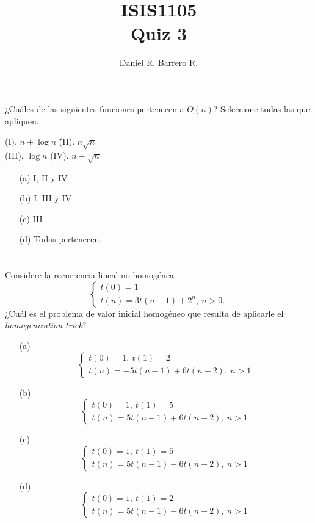 \documentclass{amsart}
\title{ISIS1105 \\ Quiz 3}
\author{Daniel R. Barrero R.}
\begin{document}
\maketitle

\section{} ¿Cuáles de las siguientes funciones pertenecen a $O(n)$? Seleccione
todas las que apliquen.
\begin{tabbing}
	(I). $n + \log n$ \= (II). $n\sqrt{n}$\\
	(III). $\log n$   \> (IV). $n + \sqrt{n}$
\end{tabbing}
\begin{enumerate}
	\item[(a)] I, II y IV
	\item[(b)] I, III y IV
	\item[(c)] III
	\item[(d)] Todas pertenecen.
\end{enumerate}

%

\section{} Considere la recurrencia lineal no-homogénea
\[
	\begin{cases}
		t(0)= 1\\
		t(n)= 3t(n-1) + 2^n,\ n > 0.
	\end{cases}
\]
¿Cuál es el problema de valor inicial homogéneo que resulta de aplicarle el
\emph{homogenization trick}?
\begin{enumerate}
	\item[(a)]
		\[
			\begin{cases}
				t(0)= 1,\ t(1)= 2\\
				t(n)= -5t(n-1) + 6t(n-2),\ n > 1
			\end{cases}
		\]
	\item[(b)]
		\[
			\begin{cases}
				t(0)= 1,\ t(1)= 5\\
				t(n)= 5t(n-1) + 6t(n-2),\ n > 1
			\end{cases}
		\]
	\item[(c)]
		\[
			\begin{cases}
				t(0)= 1,\ t(1)= 5\\
				t(n)= 5t(n-1) - 6t(n-2),\ n > 1
			\end{cases}
		\]
	\item[(d)]
		\[
			\begin{cases}
				t(0)= 1,\ t(1)= 2\\
				t(n)= 5t(n-1) - 6t(n-2),\ n > 1
			\end{cases}
		\]
\end{enumerate}
\end{document}
